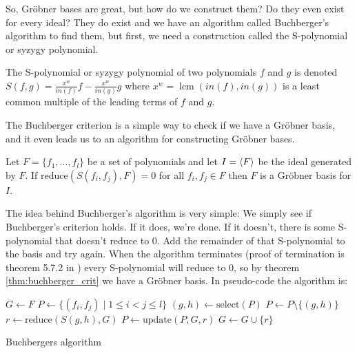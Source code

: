 \documentclass{article}
\theoremstyle{changedot}
\theoremstyle{changedotbreak}
\theoremstyle{nonumberplain}
\DeclarePairedDelimiter{\tuple}{\langle}{\rangle}
\DeclareMathOperator{\lcm}{lcm}
\begin{document}
So, Gröbner bases are great, but how do we construct them? Do they even exist for every ideal? They do exist and we have an algorithm called Buchberger's algorithm to find them, but first, we need a construction called the S-polynomial or syzygy polynomial.

\begin{definition}
  The S-polynomial or syzygy polynomial of two polynomials $f$ and $g$ is denoted $S(f, g) = \frac{x^{w}}{in(f)} f - \frac{x^{w}}{in(g)} g$ where $x^{w} = \lcm(in(f), in(g))$ is a least common multiple of the leading terms of $f$ and $g$.
\end{definition}

The Buchberger criterion is a simple way to check if we have a Gröbner basis, and it even leads us to an algorithm for constructing Gröbner bases.

\begin{theorem}\label{thm:buchberger_crit}
Let $F = \{f_{1}, \dots, f_{l}\}$ be a set of polynomials and let $I = \tuple F$ be the ideal generated by $F$. If $\text{reduce}(S(f_{i}, f_{j}), F) = 0$ for all $f_{i}, f_{j} \in F$ then $F$ is a Gröbner basis for $I$.
\end{theorem}

The idea behind Buchberger's algorithm is very simple: We simply see if Buchberger's criterion holds. If it does, we're done. If it doesn't, there is some S-polynomial that doesn't reduce to 0. Add the remainder of that S-polynomial to the basis and try again. When the algorithm terminates (proof of termination is theorem 5.7.2 in \cite{NL}) every S-polynomial will reduce to 0, so by theorem \ref{thm:buchberger_crit} we have a Gröbner basis. In pseudo-code the algorithm is:

\begin{algorithm}[H]
  
\DontPrintSemicolon

  $G \leftarrow F$ \;
  $P \leftarrow \{(f_{i}, f_{j}) \mid 1 \leq i < j \leq l\}$ \;
  {
    $(g, h) \leftarrow \text{select}(P)$ \;
    $P \leftarrow P \setminus \{(g, h)\}$ \;
    $r \leftarrow \text{reduce}(S(g, h), G)$ \;
    {
      $P \leftarrow \text{update}(P, G, r)$ \;
      $G \leftarrow G \cup \{r\}$ \;
    }
  }

\caption{Buchbergers algorithm}
\end{algorithm}
\end{document}
